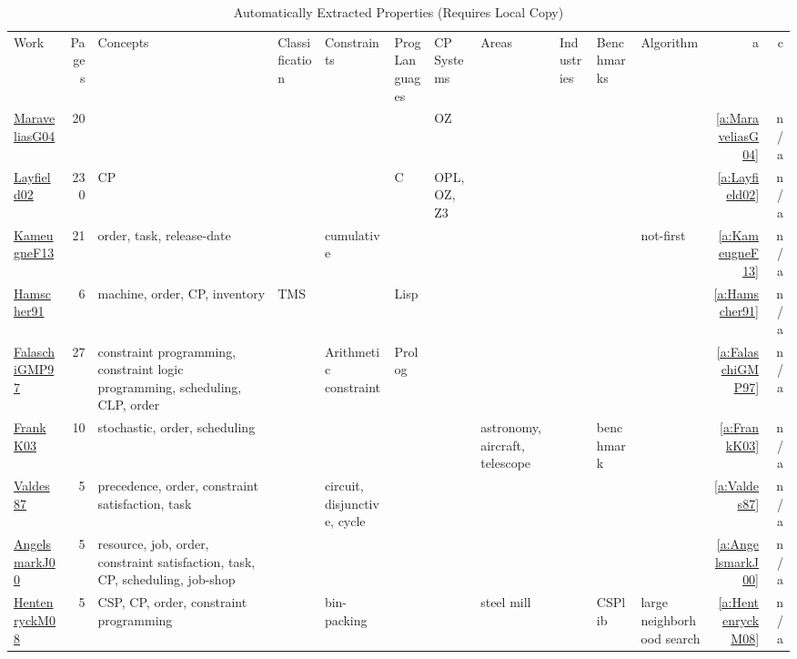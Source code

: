{\scriptsize
\begin{longtable}{>{\raggedright\arraybackslash}p{3cm}r>{\raggedright\arraybackslash}p{4cm}p{1.5cm}p{2cm}p{1.5cm}p{1.5cm}p{1.5cm}p{1.5cm}p{2cm}p{1.5cm}rr}
\rowcolor{white}\caption{Automatically Extracted  Properties (Requires Local Copy)}\\ \toprule
\rowcolor{white}Work & Pages & Concepts & Classification & Constraints & \shortstack{Prog\\Languages} & \shortstack{CP\\Systems} & Areas & Industries & Benchmarks & Algorithm & a & c\\ \midrule\endhead
\bottomrule
\endfoot
\href{../works/MaraveliasG04.pdf}{MaraveliasG04}~\cite{MaraveliasG04} & 20 &  &  &  &  & OZ &  &  &  &  & \ref{a:MaraveliasG04} & n/a\\
\href{../works/Layfield02.pdf}{Layfield02}~\cite{Layfield02} & 230 & CP &  &  & C  & OPL, OZ, Z3 &  &  &  &  & \ref{a:Layfield02} & n/a\\
\href{../works/KameugneF13.pdf}{KameugneF13}~\cite{KameugneF13} & 21 & order, task, release-date &  & cumulative &  &  &  &  &  & not-first & \ref{a:KameugneF13} & n/a\\
\href{../works/Hamscher91.pdf}{Hamscher91}~\cite{Hamscher91} & 6 & machine, order, CP, inventory & TMS &  & Lisp &  &  &  &  &  & \ref{a:Hamscher91} & n/a\\
\href{../works/FalaschiGMP97.pdf}{FalaschiGMP97}~\cite{FalaschiGMP97} & 27 & constraint programming, constraint logic programming, scheduling, CLP, order &  & Arithmetic constraint & Prolog &  &  &  &  &  & \ref{a:FalaschiGMP97} & n/a\\
\href{../works/FrankK03.pdf}{FrankK03}~\cite{FrankK03} & 10 & stochastic, order, scheduling &  &  &  &  & astronomy, aircraft, telescope &  & benchmark &  & \ref{a:FrankK03} & n/a\\
\href{../works/Valdes87.pdf}{Valdes87}~\cite{Valdes87} & 5 & precedence, order, constraint satisfaction, task &  & circuit, disjunctive, cycle &  &  &  &  &  &  & \ref{a:Valdes87} & n/a\\
\href{../works/AngelsmarkJ00.pdf}{AngelsmarkJ00}~\cite{AngelsmarkJ00} & 5 & resource, job, order, constraint satisfaction, task, CP, scheduling, job-shop &  &  &  &  &  &  &  &  & \ref{a:AngelsmarkJ00} & n/a\\
\href{../works/HentenryckM08.pdf}{HentenryckM08}~\cite{HentenryckM08} & 5 & CSP, CP, order, constraint programming &  & bin-packing &  &  & steel mill &  & CSPlib & large neighborhood search & \ref{a:HentenryckM08} & n/a\\

\end{longtable}}
